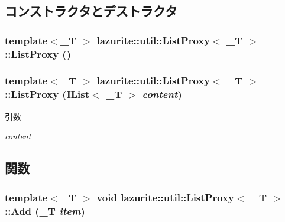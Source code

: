 \subsection{コンストラクタとデストラクタ}
\hypertarget{classlazurite_1_1util_1_1_list_proxy_3_01___t_01_4_a2b05d56c8139d1adab14de90fba34630}{
\subsubsection[{ListProxy}]{\setlength{\rightskip}{0pt plus 5cm}template$<$\_\-T $>$ lazurite::util::ListProxy$<$ \_\-T $>$::ListProxy ()}}
\label{classlazurite_1_1util_1_1_list_proxy_3_01___t_01_4_a2b05d56c8139d1adab14de90fba34630}
\hypertarget{classlazurite_1_1util_1_1_list_proxy_3_01___t_01_4_a1b722cbe4b8a5838d5ae0d5d45a2e641}{
\subsubsection[{ListProxy}]{\setlength{\rightskip}{0pt plus 5cm}template$<$\_\-T $>$ lazurite::util::ListProxy$<$ \_\-T $>$::ListProxy (IList$<$ \_\-T $>$ {\em content})}}
\label{classlazurite_1_1util_1_1_list_proxy_3_01___t_01_4_a1b722cbe4b8a5838d5ae0d5d45a2e641}

\begin{DoxyParams}{引数}
\item[{\em content}]\end{DoxyParams}


\subsection{関数}
\hypertarget{classlazurite_1_1util_1_1_list_proxy_3_01___t_01_4_a8a8288d8815ad6dec4000ab681a98735}{
\subsubsection[{Add}]{\setlength{\rightskip}{0pt plus 5cm}template$<$\_\-T $>$ void lazurite::util::ListProxy$<$ \_\-T $>$::Add (\_\-T {\em item})}}
\label{classlazurite_1_1util_1_1_list_proxy_3_01___t_01_4_a8a8288d8815ad6dec4000ab681a98735}

